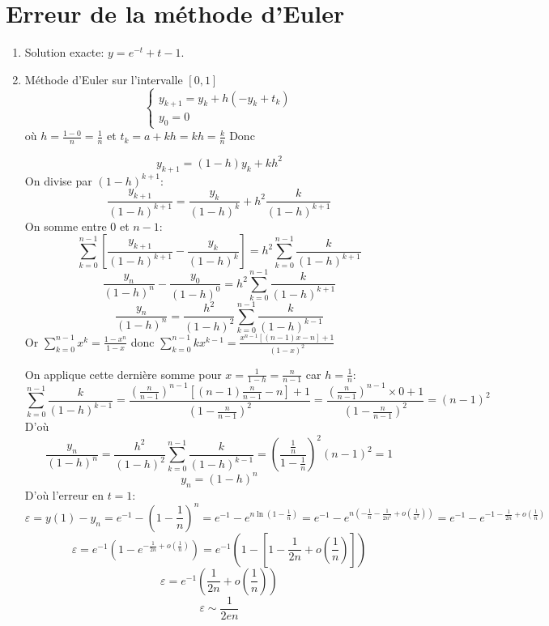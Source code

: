 \documentclass[a4paper]{article}
\begin{document}
\section{Erreur de la méthode d'Euler}
\begin{enumerate}
\item Solution exacte: $y=e^{-t}+t-1$.
\item Méthode d'Euler sur l'intervalle $[0,1]$
\[\left\{\begin{array}{l}
y_{k+1}=y_k+h(-y_k+t_k)\\
y_0=0
\end{array}\right.
\]
où $h=\frac{1-0}{n} =\frac 1n$ et $t_k=a+k h =kh=\frac{k}{n}$
Donc 

\[y_{k+1}=(1-h)y_{k}+kh^2\]
On divise par $(1-h)^{k+1}$:
\[\frac{y_{k+1}}{(1-h)^{k+1} }=\frac{y_{k}}{(1-h)^{k} }+h^2 \frac{k}{(1-h)^{k+1} }\]
On somme entre 0 et $n-1$:
\[\sum_{k=0}^{n-1}\left[\frac{y_{k+1}}{(1-h)^{k+1} }-\frac{y_{k}}{(1-h)^{k} }\right]=h^2 \sum_{k=0}^{n-1}\frac{k}{(1-h)^{k+1} }\]
\[\frac{y_{n}}{(1-h)^{n} }-\frac{y_{0}}{(1-h)^{0} }=h^2 \sum_{k=0}^{n-1}\frac{k}{(1-h)^{k+1} }\]
\[\frac{y_{n}}{(1-h)^{n} }=\frac{h^2}{(1-h)^2} \sum_{k=0}^{n-1}\frac{k}{(1-h)^{k-1} }\]
Or $\sum_{k=0}^{n-1}x^k=\frac{1-x^n}{1-x}$ donc $\sum_{k=0}^{n-1}kx^{k-1}=\frac{x^{n-1}[(n-1)x-n]+1}{(1-x)^2}$

On applique cette dernière somme pour $x=\frac{1}{1-h}=\frac{n}{n-1}$ car $h=\frac 1n$:
\[ \sum_{k=0}^{n-1}\frac{k}{(1-h)^{k-1} }=\frac{\left(\frac{n}{n-1}\right)^{n-1}[(n-1)\frac{n}{n-1}-n]+1}{(1-\frac{n}{n-1})^2}=\frac{\left(\frac{n}{n-1}\right)^{n-1}\times 0+1}{(1-\frac{n}{n-1})^2}=(n-1)^2\]
D'où 
\[\frac{y_{n}}{(1-h)^{n} }=\frac{h^2}{(1-h)^2} \sum_{k=0}^{n-1}\frac{k}{(1-h)^{k-1} }= \left(\frac{\frac{1}{n}}{1-\frac{1}{n}}\right)^2(n-1)^2=1   \]
\[y_{n}=(1-h)^{n} \]
D'où l'erreur en $t=1$:
\[\varepsilon =y(1)-y_n= e^{-1}-(1-\frac 1n)^n =e^{-1}-e^{n\ln(1-\frac 1n)}=e^{-1}-e^{n(-\frac 1n-\frac 1{2n^2}+o(\frac 1{n^2}))}=e^{-1}-e^{-1-\frac 1{2n}+o(\frac 1n)}\]
\[\varepsilon =e^{-1}\left(1-e^{-\frac 1{2n}+o(\frac 1n)}\right)=e^{-1}\left(1-[1-\frac 1{2n}+o(\frac 1n)]\right)\]
\[\varepsilon =e^{-1}\left(\frac 1{2n}+o(\frac 1n)\right)\]
\[\varepsilon \sim \frac {1}{2en}\]
\end{enumerate}

\end{document}
